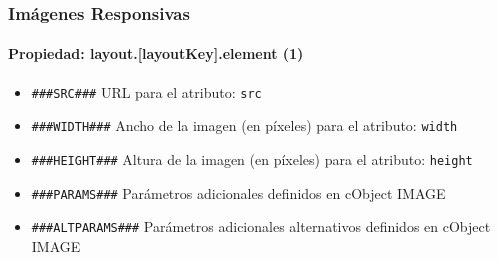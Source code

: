 
\begin{frame}[fragile]
	\frametitle{Imágenes Responsivas}
	\framesubtitle{Propiedad: layout.[layoutKey].element (1)}


	\begin{itemize}
			\item \lstinline!###SRC###!\newline
				URL para el atributo: \texttt{src}

			\item \lstinline!###WIDTH###!\newline
				Ancho de la imagen (en píxeles) para el atributo: \texttt{width}

			\item \lstinline!###HEIGHT###!\newline
				Altura de la imagen (en píxeles) para el atributo: \texttt{height}

			\item \lstinline!###PARAMS###!\newline
				Parámetros adicionales definidos en cObject IMAGE

			\item \lstinline!###ALTPARAMS###!\newline
				Parámetros adicionales alternativos definidos en cObject IMAGE

	\end{itemize}

\end{frame}


